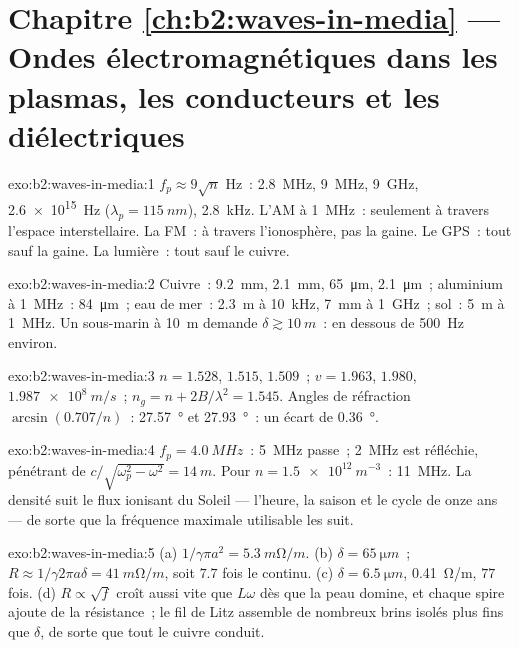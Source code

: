 \section*{Chapitre \ref{ch:b2:waves-in-media} --- Ondes électromagnétiques dans les plasmas, les conducteurs et les diélectriques}

\begin{solution}{exo:b2:waves-in-media:1}
$f_p \approx 9\sqrt n$ Hz~: \qty{2.8}{MHz}, \qty{9}{MHz}, \qty{9}{GHz}, \qty{2.6e15}{Hz}
($\lambda_p = \qty{115}{nm}$), \qty{2.8}{kHz}. L'AM à \qty{1}{MHz}~: seulement à travers
l'espace interstellaire. La FM~: à travers l'ionosphère, pas la gaine. Le GPS~:
tout sauf la gaine. La lumière~: tout sauf le cuivre.
\end{solution}

\begin{solution}{exo:b2:waves-in-media:2}
Cuivre~: \qty{9.2}{mm}, \qty{2.1}{mm}, \qty{65}{\micro m}, \qty{2.1}{\micro m}~; aluminium à
\qty{1}{MHz}~: \qty{84}{\micro m}~; eau de mer~: \qty{2.3}{m} à \qty{10}{kHz}, \qty{7}{mm} à
\qty{1}{GHz}~; sol~: \qty{5}{m} à \qty{1}{MHz}. Un sous-marin à \qty{10}{m} demande $\delta
\gtrsim \qty{10}{m}$~: en dessous de \qty{500}{Hz} environ.
\end{solution}

\begin{solution}{exo:b2:waves-in-media:3}
$n = 1.528$, $1.515$, $1.509$~; $v = 1.963$, $1.980$, $\qty{1.987e8}{m/s}$~; $n_g = n +
2B/\lambda^2 = 1.545$. Angles de réfraction $\arcsin(0.707/n)$~: \qty{27.57}{\degree} et
\qty{27.93}{\degree}~: un écart de \qty{0.36}{\degree}.
\end{solution}

\begin{solution}{exo:b2:waves-in-media:4}
$f_p = \qty{4.0}{MHz}$~: \qty{5}{MHz} passe~; \qty{2}{MHz} est réfléchie, pénétrant de
$c/\sqrt{\omega_p^2 - \omega^2} = \qty{14}{m}$. Pour $n = \qty{1.5e12}{m^{-3}}$~: \qty{11}{MHz}. La
densité suit le flux ionisant du Soleil --- l'heure, la saison et le
cycle de onze ans --- de sorte que la fréquence maximale utilisable les suit.
\end{solution}

\begin{solution}{exo:b2:waves-in-media:5}
(a) $1/\gamma\pi a^2 = \qty{5.3}{m\ohm/m}$. (b) $\delta = \qty{65}{\micro m}$~; $R \approx 1/\gamma2\pi a\delta
= \qty{41}{m\ohm/m}$, soit $7.7$ fois le continu. (c) $\delta = \qty{6.5}{\micro m}$, \qty{0.41}{\ohm/m},
$77$ fois. (d) $R \propto \sqrt f$ croît aussi vite que $L\omega$ dès que la peau
domine, et chaque spire ajoute de la résistance~; le fil de Litz assemble de nombreux
brins isolés plus fins que $\delta$, de sorte que tout le cuivre conduit.
\end{solution}

